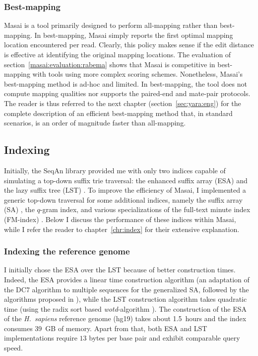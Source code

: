 \subsubsection{Best-mapping}

Masai is a tool primarily designed to perform all-mapping rather than best-mapping.
In best-mapping, Masai simply reports the first optimal mapping location encountered per read.
Clearly, this policy makes sense if the edit distance is effective at identifying the original mapping locations.
The evaluation of section~\ref{masai:evaluation:rabema} shows that Masai is competitive in best-mapping with tools using more complex scoring schemes.
Nonetheless, Masai's best-mapping method is ad-hoc and limited.
In best-mapping, the tool does not compute mapping qualities nor supports the paired-end and mate-pair protocols.
The reader is thus referred to the next chapter (section~\ref{sec:yara:eng}) for the complete description of an efficient best-mapping method that, in standard scenarios, is an order of magnitude faster than all-mapping.

\subsection{Indexing}
\label{masai:engineering:index}

Initially, the SeqAn library provided me with only two indices capable of simulating a top-down suffix trie traversal: the enhanced suffix array (ESA) \citep{Abouelhoda2004} and the lazy suffix tree (LST) \citep{Giegerich1999}.
To improve the efficiency of Masai, I implemented a generic top-down traversal for some additional indices, namely the suffix array (SA) \citep{Manber1990}, the $q$-gram index, and various specializations of the full-text minute index (FM-index) \citep{Ferragina2001}.
Below I discuss the performance of these indices within Masai, while I refer the reader to chapter~\ref{chr:index} for their extensive explanation.

\subsubsection{Indexing the reference genome}

I initially chose the ESA over the LST because of better construction times.
Indeed, the ESA provides a linear time construction algorithm (an adaptation of the DC7 algorithm \citep{Dementiev2008} to multiple sequences \citep{Weese2013} for the generalized SA, followed by the algorithms proposed in \citep{Kasai2001,Abouelhoda2004}), while the LST construction algorithm takes quadratic time (using the radix sort based \emph{wotd}-algorithm \citep{Giegerich1999}).
The construction of the ESA of the \emph{H.~sapiens} reference genome (hg19) takes about 1.5~hours and the index consumes 39~GB of memory.%
Apart from that, both ESA and LST implementations require $13$ bytes per base pair and exhibit comparable query speed.

